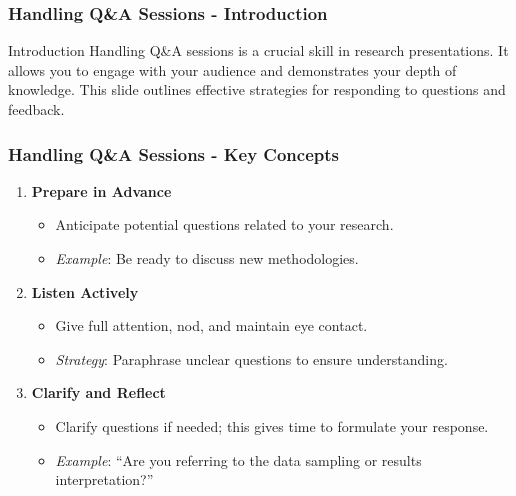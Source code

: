 \documentclass[aspectratio=169]{beamer}
\begin{document}
\begin{frame}[fragile]
    \frametitle{Handling Q\&A Sessions - Introduction}
    \begin{block}{Introduction}
        Handling Q\&A sessions is a crucial skill in research presentations. It allows you to engage with your audience and demonstrates your depth of knowledge. This slide outlines effective strategies for responding to questions and feedback.
    \end{block}
\end{frame}

\begin{frame}[fragile]
    \frametitle{Handling Q\&A Sessions - Key Concepts}
    \begin{enumerate}
        \item \textbf{Prepare in Advance}
        \begin{itemize}
            \item Anticipate potential questions related to your research.
            \item \textit{Example}: Be ready to discuss new methodologies.
        \end{itemize}

        \item \textbf{Listen Actively}
        \begin{itemize}
            \item Give full attention, nod, and maintain eye contact.
            \item \textit{Strategy}: Paraphrase unclear questions to ensure understanding.
        \end{itemize}

        \item \textbf{Clarify and Reflect}
        \begin{itemize}
            \item Clarify questions if needed; this gives time to formulate your response.
            \item \textit{Example}: “Are you referring to the data sampling or results interpretation?”
        \end{itemize}
    \end{enumerate}
\end{frame}
\end{document}
